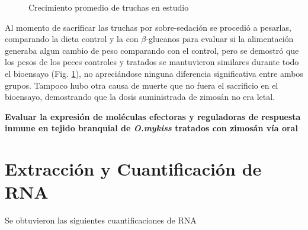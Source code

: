 \documentclass[12pt,a4paper,oneside]{scrbook}
\begin{document}
\begin{figure}[h!]
    \centering
    \caption {Crecimiento promedio de truchas en estudio}
    \label {fig:pesos}
\end{figure}

Al momento de sacrificar las truchas por sobre-sedación se procedió a
pesarlas, comparando la dieta control y la con $\beta$-glucanos para
evaluar si la alimentación generaba algun cambio de peso comparando con
el control, pero se demostró que los pesos de los peces controles y
tratados se mantuvieron similares durante todo el bioensayo (Fig.
\ref{fig:pesos}), no apreciándose ninguna diferencia significativa entre
ambos grupos. Tampoco hubo otra causa de muerte que no fuera el
sacrificio en el bioensayo, demostrando que la dosis suministrada de
zimosán no era letal.

\textbf{Evaluar la expresión de moléculas efectoras y reguladoras de respuesta inmune en tejido branquial de \emph{O.mykiss} tratados con zimosán vía oral}

\section{Extracción y Cuantificación de RNA}

Se obtuvieron las siguientes cuantificaciones de RNA
\end{document}
